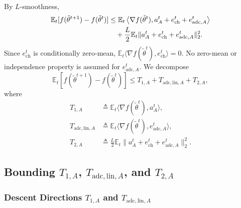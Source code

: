 \documentclass[conference]{IEEEtran}
\begin{document}
By $L$-smoothness,
\begin{align}
    \label{eqn:descent_expansion}
    \mathbb{E}_t[f(\tilde\theta^{t+1})-f(\tilde\theta^t)]
    &\le
    \mathbb{E}_t\left\langle\nabla f(\tilde\theta^t),
    a_A^t+e_{\mathrm{ch}}^t+e_{\mathrm{adc},A}^t\right\rangle
    \notag\\
    &\quad+
    \frac{L}{2}\mathbb{E}_t\|a_A^t+e_{\mathrm{ch}}^t+e_{\mathrm{adc},A}^t\|_2^2.
\end{align}
Since $e_{\mathrm{ch}}^t$ is conditionally zero-mean, $\mathbb{E}_t\langle\nabla f(\tilde\theta^t),e_{\mathrm{ch}}^t\rangle=0$. No zero-mean or independence property is assumed for $e_{\mathrm{adc},A}^t$. We decompose
\begin{equation}
    \mathbb{E}_t[f(\tilde\theta^{t+1})-f(\tilde\theta^t)]
    \le T_{1,A}+T_{\mathrm{adc,lin},A}+T_{2,A},
\end{equation}
where
\begin{align}
    T_{1,A}&\triangleq\mathbb{E}_t\langle\nabla f(\tilde\theta^t),a_A^t\rangle,\\
    T_{\mathrm{adc,lin},A}&\triangleq\mathbb{E}_t\langle\nabla f(\tilde\theta^t),e_{\mathrm{adc},A}^t\rangle,\\
    T_{2,A}&\triangleq\frac{L}{2}\mathbb{E}_t\|a_A^t+e_{\mathrm{ch}}^t+e_{\mathrm{adc},A}^t\|_2^2.
\end{align}

\subsection{Bounding $T_{1,A}$, $T_{\mathrm{adc,lin},A}$, and $T_{2,A}$}

\subsubsection{Descent Directions $T_{1,A}$ and $T_{\mathrm{adc,lin},A}$}
\end{document}
